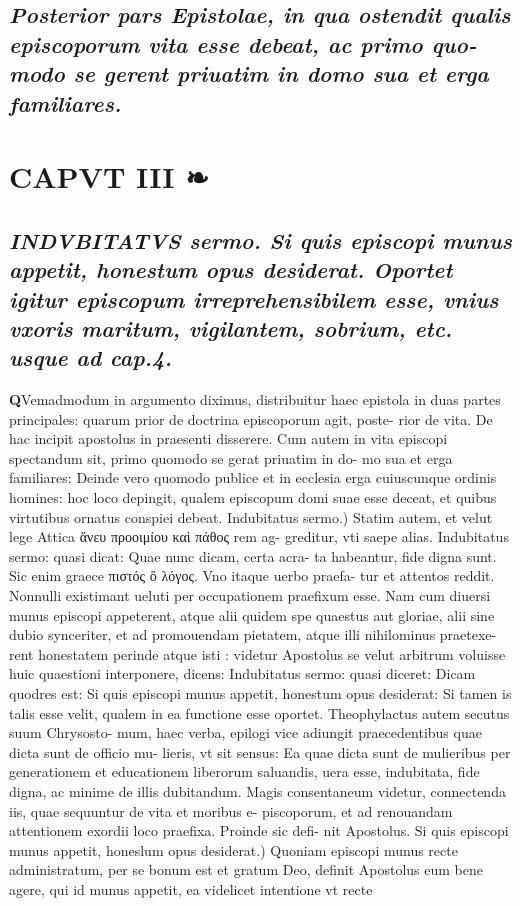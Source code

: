 \documentclass{article}
\begin{document}
\begin{pages}
\subsection*{\textit{Posterior pars Epistolae, in qua ostendit qualis episcoporum vita esse debeat, ac primo quo- modo se gerent priuatim in domo sua et erga familiares. }}
\endnumbering\beginnumbering\section{CAPVT III ❧}
{}
\subsection*{\textit{\huge\textbf{I}\normalsize NDVBITATVS sermo. Si quis episcopi munus appetit, honestum opus desiderat. Oportet igitur episcopum irreprehensibilem esse, vnius vxoris maritum, vigilantem, sobrium, etc. usque ad cap.4. }}\pstart \huge\textbf{Q}\normalsize Vemadmodum in argumento diximus, distribuitur haec epistola in duas partes principales: quarum prior de doctrina episcoporum agit, poste- rior de vita. De hac incipit apostolus in praesenti disserere. Cum autem in vita episcopi spectandum sit, primo quomodo se gerat priuatim in do- mo sua et erga familiares: Deinde vero quomodo publice et in ecclesia erga cuiuscunque  ordinis homines: hoc loco depingit, qualem episcopum domi suae esse deceat, et quibus virtutibus ornatus conspiei debeat.  \pend\pstart Indubitatus sermo.) Statim autem, et velut lege Attica ἄνευ προοιμίου καὶ πάθος rem ag- greditur, vti saepe alias. Indubitatus sermo: quasi dicat: Quae nunc dicam, certa acra- ta habeantur, fide digna sunt. Sic enim graece πιστός ὅ λόγος. Vno itaque  uerbo praefa- tur et attentos reddit. Nonnulli existimant ueluti per occupationem praefixum esse. Nam cum diuersi munus episcopi appeterent, atque  alii quidem spe quaestus aut gloriae, alii sine dubio synceriter, et ad promouendam pietatem, atque  illi nihilominus praetexe- rent honestatem perinde atque  isti : videtur Apostolus se velut arbitrum voluisse huic quaestioni interponere, dicens: Indubitatus sermo: quasi diceret: Dicam quodres est: Si quis episcopi munus appetit, honestum opus desiderat: Si tamen is talis esse velit, qualem in ea functione esse oportet. Theophylactus autem secutus suum Chrysosto- mum, haec verba, epilogi vice adiungit praecedentibus quae dicta sunt de officio mu- lieris, vt sit sensus: Ea quae dicta sunt de mulieribus per generationem et educationem liberorum saluandis, uera esse, indubitata, fide digna, ac minime de illis dubitandum. Magis consentaneum videtur, connectenda iis, quae sequuntur de vita et moribus e- piscoporum, et ad renouandam attentionem exordii loco praefixa. Proinde sic defi- nit Apostolus.  \pend\pstart Si quis episcopi munus appetit, honeslum opus desiderat.) Quoniam episcopi munus recte administratum, per se bonum est et gratum Deo, definit Apostolus eum bene agere, qui id munus appetit, ea videlicet intentione vt recte 
\end{pages}
\end{document}
